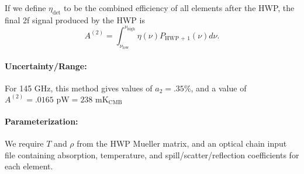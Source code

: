 If we define $\eta_\text{det}$ to be the combined efficiency of all elements after the HWP,
the final 2f signal produced by the HWP is 
\[
A^{(2)} = \int_{\nu_\text{low}}^{\nu_\text{high}} \eta(\nu) P_\text{HWP + 1}(\nu) d\nu.
\]
\paragraph{Uncertainty/Range:}
For 145 GHz, this method gives values of $a_2 = .35\%$, and a value of 
$A^{(2)} = .0165 \text{ pW} = 238 \text{ mK}_\text{CMB}$

\paragraph{Parameterization:}
We require $T$ and $\rho$ from the HWP Mueller matrix\cite{Salatino16}, and an optical chain input file containing
absorption, temperature, and spill/scatter/reflection coefficients for each element.

